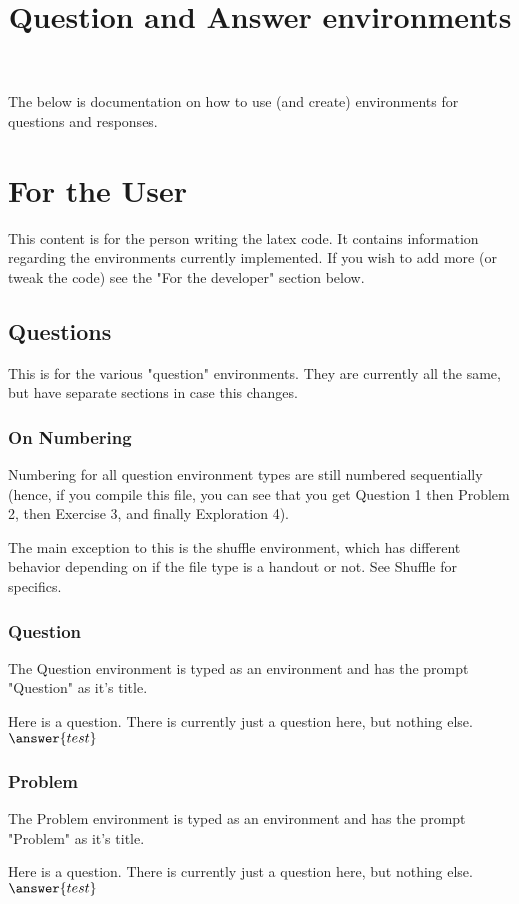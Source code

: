 \documentclass{ximera}
\title{Question and Answer environments}
\begin{document}
The below is documentation on how to use (and create) environments for questions and responses.

\tableofcontents

\section{For the User}
This content is for the person writing the latex code. It contains information regarding the environments currently implemented. If you wish to add more (or tweak the code) see the "For the developer" section below.

\subsection{Questions}
This is for the various "question" environments. They are currently all the same, but have separate sections in case this changes.

\subsubsection{On Numbering}
Numbering for all question environment types are still numbered sequentially (hence, if you compile this file, you can see that you get Question 1 then Problem 2, then Exercise 3, and finally Exploration 4). 

The main exception to this is the shuffle environment, which has different behavior depending on if the file type is a handout or not. See Shuffle for specifics.


\subsubsection{Question}
The Question environment is typed as an environment and has the prompt "Question" as it's title. 

\begin{question}
Here is a question. There is currently just a question here, but nothing else.
$\answer{test}$
\end{question}

\subsubsection{Problem}
The Problem environment is typed as an environment and has the prompt "Problem" as it's title. 

\begin{problem}
Here is a question. There is currently just a question here, but nothing else.
$\answer{test}$
\end{problem}
\end{document}

